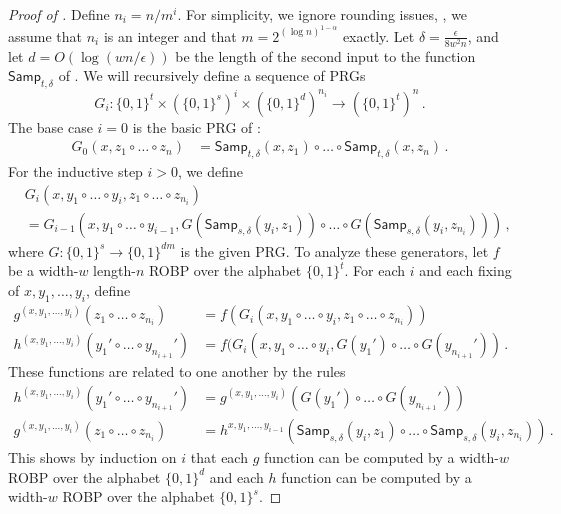 \begin{proof}[Proof of ]
Define $n_i = n / m^i$. For simplicity, we ignore rounding issues, \ie, we assume that $n_i$ is an integer and that $m = 2^{(\log n)^{1 - \alpha}}$ exactly. Let $\delta = \frac{\epsilon}{8w^2 n}$, and let $d = O(\log(wn/\epsilon))$ be the length of the second input to the function $\mathsf{Samp}_{t, \delta}$ of . We will recursively define a sequence of PRGs
$$
G_i \colon \{0, 1\}^t \times (\{0, 1\}^s)^i \times (\{0, 1\}^d)^{n_i} \to (\{0, 1\}^t)^n\,.
$$
The base case $i = 0$ is the basic PRG of :
\begin{align*}
G_0(x, z_1 \circ \dots \circ z_n) &= \mathsf{Samp}_{t, \delta}(x, z_1) \circ \dots \circ \mathsf{Samp}_{t, \delta}(x, z_n)\,.
\end{align*}
For the inductive step $i > 0$, we define
\begin{align*}
&G_i(x, y_1 \circ \dots \circ y_i, z_1 \circ \dots \circ z_{n_i})\\
&{}= G_{i - 1}(x, y_1 \circ \dots \circ y_{i - 1}, G(\mathsf{Samp}_{s, \delta}(y_i, z_1)) \circ \dots \circ G(\mathsf{Samp}_{s, \delta}(y_i, z_{n_i})))\,,
\end{align*}
where $G \colon \{0, 1\}^s \to \{0, 1\}^{dm}$ is the given PRG. To analyze these generators, let $f$ be a width-$w$ length-$n$ ROBP over the alphabet $\{0, 1\}^t$. For each $i$ and each fixing of $x, y_1, \dots, y_i$, define
\begin{align*}
g^{(x, y_1, \dots, y_i)}(z_1 \circ \dots \circ z_{n_i}) &= f(G_i(x, y_1 \circ \dots \circ y_i, z_1 \circ \dots \circ z_{n_i})) \\
h^{(x, y_1, \dots, y_i)}(y_1' \circ \dots \circ y_{n_{i + 1}}') &= f(G_i(x, y_1 \circ \dots \circ y_i, G(y_1') \circ \dots \circ G(y_{n_{i + 1}}'))\,.
\end{align*}
These functions are related to one another by the rules
\begin{align}
h^{(x, y_1, \dots, y_i)}(y_1' \circ \dots \circ y_{n_{i + 1}}') &= g^{(x, y_1, \dots, y_i)}(G(y_1') \circ \dots \circ G(y_{n_{i + 1}}')) \label{eqn:h-from-g} \\
g^{(x, y_1, \dots, y_i)}(z_1 \circ \dots \circ z_{n_i}) &= h^{x, y_1, \dots, y_{i - 1}}(\mathsf{Samp}_{s, \delta}(y_i, z_1) \circ \dots \circ \mathsf{Samp}_{s, \delta}(y_i, z_{n_i}))\,. \label{eqn:g-from-h}
\end{align}
This shows by induction on $i$ that each $g$ function can be computed by a width-$w$ ROBP over the alphabet $\{0, 1\}^d$ and each $h$ function can be computed by a width-$w$ ROBP over the alphabet $\{0, 1\}^s$.


\end{proof}
